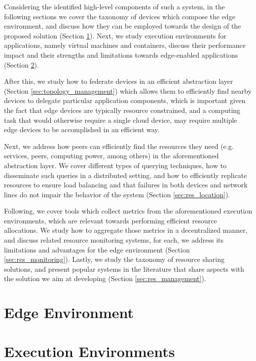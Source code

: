 Considering the identified high-level components of such a system, in the following sections we cover the taxonomy of devices which compose the edge environment, and discuss how they can be employed towards the design of the proposed solution (Section \ref{sec:edge_computing}). Next, we study execution environments for applications, namely virtual machines and containers, discuss their performance impact and their strengths and limitations towards edge-enabled applications (Section \ref{sec:runtime_environments}). 

After this, we study how to federate devices in an efficient abstraction layer (Section \ref{sec:topology_management}) which allows them to efficiently find nearby devices to delegate particular application components, which is important given the fact that edge devices are typically resource constrained, and a computing task that would otherwise require a single cloud device, may require multiple edge devices to be accomplished in an efficient way.

Next, we address how peers can efficiently find the resources they need (e.g. services, peers, computing power, among others) in the aforementioned abstraction layer. We cover different types of querying techniques, how to disseminate such queries in a distributed setting, and how to efficiently replicate resources to ensure load balancing and that failures in both devices and network lines do not impair the behavior of the system (Section \ref{sec:res_location}).

Following, we cover tools which collect metrics from the aforementioned execution environments, which are relevant towards performing efficient resource allocations. We study how to aggregate those metrics in a decentralized manner, and discuss related resource monitoring systems, for each, we address its limitations and advantages for the edge environment (Section \ref{sec:res_monitoring}). Lastly, we study the taxonomy of resource sharing solutions, and present popular systems in the literature that share aspects with the solution we aim at developing (Section \ref{sec:res_management}). 

\section{Edge Environment} \label{sec:edge_computing} 

\section{Execution Environments} \label{sec:runtime_environments} 

